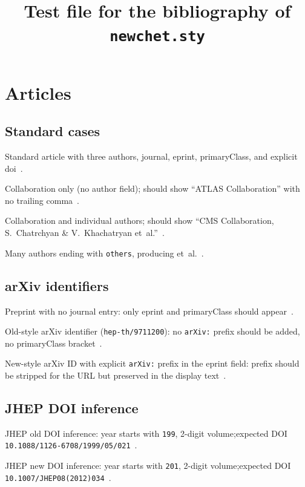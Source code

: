 \documentclass[12pt]{article}
\title{Test file for the bibliography of \texttt{newchet.sty}}
\author{}
\date{}
\begin{document}
\maketitle
\tableofcontents

\section{Articles}

\subsection{Standard cases}

Standard article with three authors, journal, eprint, primaryClass, and explicit doi~\cite{standard}.

Collaboration only (no author field); should show ``ATLAS Collaboration'' with no trailing comma~\cite{collab_only}.

Collaboration and individual authors; should show ``CMS Collaboration, S.~Chatrchyan \& V.~Khachatryan et~al.''~\cite{collab_and_author}.

Many authors ending with \texttt{others}, producing et~al.~\cite{many_authors}.

\subsection{arXiv identifiers}

Preprint with no journal entry: only eprint and primaryClass should appear~\cite{preprint_only}.

Old-style arXiv identifier (\texttt{hep-th/9711200}): no \texttt{arXiv:} prefix should be added, no primaryClass bracket~\cite{old_arxiv}.

New-style arXiv ID with explicit \texttt{arXiv:} prefix in the eprint field: prefix should be stripped for the URL but preserved in the display text~\cite{arxiv_prefix}.

\subsection{JHEP DOI inference}

JHEP old DOI inference: year starts with \texttt{199}, 2-digit volume;\newline expected DOI \texttt{10.1088/1126-6708/1999/05/021}~\cite{jhep_old_doi}.

JHEP new DOI inference: year starts with \texttt{201}, 2-digit volume;\newline expected DOI \texttt{10.1007/JHEP08(2012)034}~\cite{jhep_new_doi}.
\end{document}
